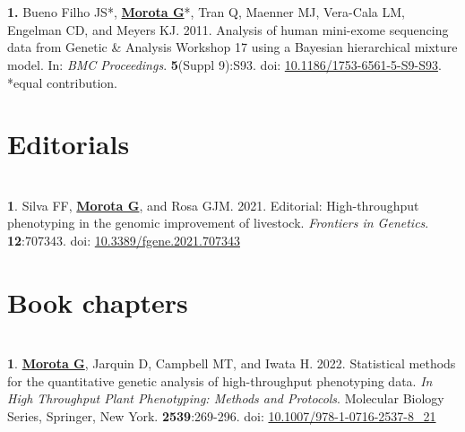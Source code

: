 \documentclass[margin,line,10pt]{res}
\newenvironment{list1}{
  \begin{list}{\ding{113}}{%
      \setlength{\itemsep}{0in}
      \setlength{\parsep}{0in} \setlength{\parskip}{0in}
      \setlength{\topsep}{0in} \setlength{\partopsep}{0in} 
      \setlength{\leftmargin}{0.17in}}}{\end{list}}
\begin{document}
\begin{resume}
\section{}
\begin{list1}
\item [\bf{1}.] Bueno Filho JS*, {\bf \underline{Morota G}}*, Tran Q, Maenner MJ, Vera-Cala LM, Engelman CD, and Meyers KJ. 2011. Analysis of human mini-exome sequencing data from Genetic \& Analysis Workshop 17 using a  Bayesian hierarchical mixture model. In: \emph{BMC Proceedings}. {\bf 5}(Suppl 9):S93. doi: \textcolor{blue}{\href{http://dx.doi.org/10.1186/1753-6561-5-S9-S93}{10.1186/1753-6561-5-S9-S93}}. *equal contribution.   
\end{list1}




\vspace{1.0cm}
\section{\sc Editorials}
\vspace{1.0cm}

\section{}
\begin{list1}
\item [{\bf 1}.]  Silva FF, {\bf \underline{Morota G}}, and Rosa GJM. 2021. Editorial: High-throughput phenotyping in the genomic improvement of livestock. \emph{Frontiers in Genetics}. \textbf{12}:707343. doi: \textcolor{blue}{\href{https://doi.org/10.3389/fgene.2021.707343}{10.3389/fgene.2021.707343}}
\end{list1}


\vspace{1.0cm}
\section{\sc Book chapters}
\vspace{1.0cm}

\section{}
\begin{list1}

\item  [{\bf 1}.] \textbf{\underline{Morota G}}, Jarquin D, Campbell MT, and Iwata H. 2022. Statistical methods for the quantitative genetic analysis of high-throughput phenotyping data. \emph{In High Throughput Plant Phenotyping: Methods and Protocols}. Molecular Biology Series, Springer, New York. \textbf{2539}:269-296. doi: \textcolor{blue}{\href{https://doi.org/10.1007/978-1-0716-2537-8_21}{10.1007/978-1-0716-2537-8\_21}}


\end{list1}
\end{resume}
\end{document}

